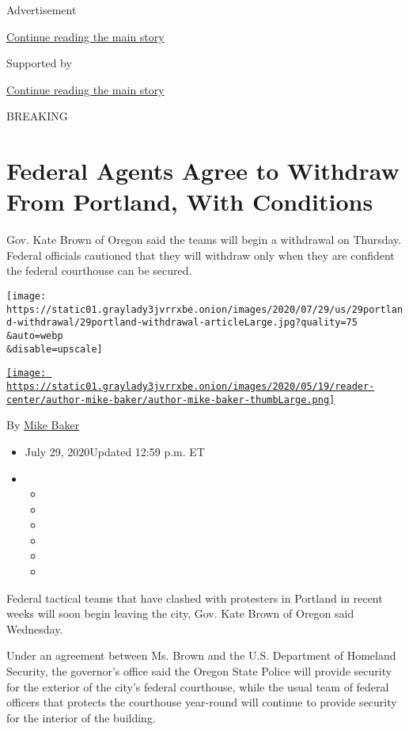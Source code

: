 Advertisement

\protect\hyperlink{after-top}{Continue reading the main story}

Supported by

\protect\hyperlink{after-sponsor}{Continue reading the main story}

BREAKING

\hypertarget{federal-agents-agree-to-withdraw-from-portland-with-conditions}{%
\section{Federal Agents Agree to Withdraw From Portland, With
Conditions}\label{federal-agents-agree-to-withdraw-from-portland-with-conditions}}

Gov. Kate Brown of Oregon said the teams will begin a withdrawal on
Thursday. Federal officials cautioned that they will withdraw only when
they are confident the federal courthouse can be secured.

\texttt{[image: https://static01.graylady3jvrrxbe.onion/images/2020/07/29/us/29portland-withdrawal/29portland-withdrawal-articleLarge.jpg?quality=75\\\&auto=webp\\\&disable=upscale]}

\href{https://www.nytimes3xbfgragh.onion/by/mike-baker}{\texttt{[image: https://static01.graylady3jvrrxbe.onion/images/2020/05/19/reader-center/author-mike-baker/author-mike-baker-thumbLarge.png]}}

By \href{https://www.nytimes3xbfgragh.onion/by/mike-baker}{Mike Baker}

\begin{itemize}
\item
  July 29, 2020Updated 12:59 p.m. ET
\item
  \begin{itemize}
  \item
  \item
  \item
  \item
  \item
  \item
  \end{itemize}
\end{itemize}

Federal tactical teams that have clashed with protesters in Portland in
recent weeks will soon begin leaving the city, Gov. Kate Brown of Oregon
said Wednesday.

Under an agreement between Ms. Brown and the U.S. Department of Homeland
Security, the governor's office said the Oregon State Police will
provide security for the exterior of the city's federal courthouse,
while the usual team of federal officers that protects the courthouse
year-round will continue to provide security for the interior of the
building.

